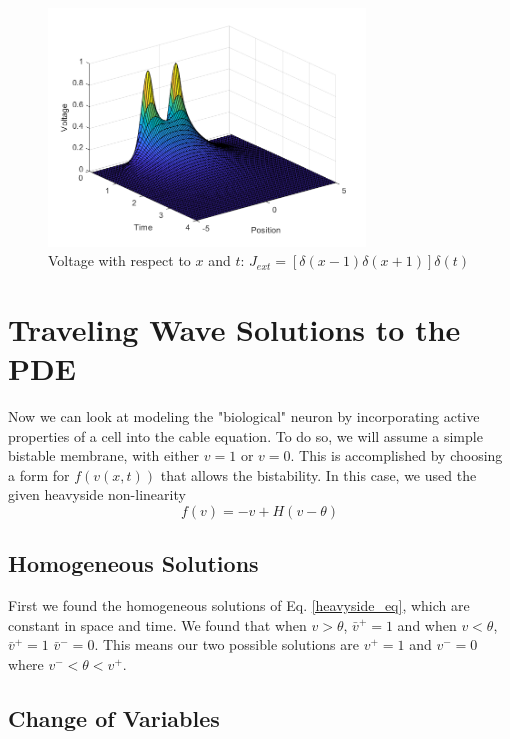 \documentclass{article}
\begin{document}
\begin{figure}[H]
\centering
\includegraphics[width=0.75\textwidth]{fig3.png}
\caption{Voltage with respect to $x$ and $t$: $J_{ext}=[\delta(x-1)\delta(x+1)]\delta(t)$}
\label{fig:gen_sol_dirac}
\end{figure}

\section{Traveling Wave Solutions to the PDE}

Now we can look at modeling the "biological" neuron by incorporating active properties of a cell into the cable equation. To do so, we will assume a simple bistable membrane, with either $v = 1$ or $v = 0$. This is accomplished by choosing a form for $f(v(x,t))$ that allows the bistability. In this case, we used the given heavyside non-linearity
\begin{equation} \label{heavyside_eq}
    f(v)=-v+H(v-\theta)
\end{equation}

\subsection{Homogeneous Solutions} 
First we found the homogeneous solutions of Eq. \ref{heavyside_eq}, which are constant in space and time. We found that when $v>\theta$, $\bar{v}^+=1$ and when $v<\theta$, $\bar{v}^+=1$ $\bar{v}^-=0$. This means our two possible solutions are $v^+=1$ and $v^-=0$ where $v^-<\theta<v^+$.

\subsection{Change of Variables} 
\end{document}
